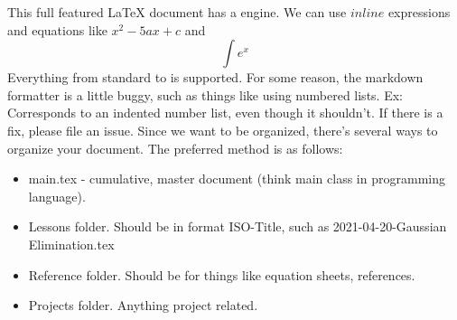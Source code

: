 \markdownRendererUlBegin
\markdownRendererUlItem This full featured LaTeX document has a  engine.\markdownRendererUlItemEnd 
\markdownRendererUlItem We can use $inline$ expressions and equations like $x^2-5ax+c$ and $$\int e^x$$\markdownRendererUlItemEnd 
\markdownRendererUlItem Everything from standard  to  is supported.\markdownRendererUlItemEnd 
\markdownRendererUlEnd \markdownRendererInterblockSeparator
{}For some reason, the markdown formatter is a little buggy, such as things like using numbered lists. Ex:\markdownRendererInterblockSeparator
{}\markdownRendererOlBeginTight
{}Corresponds to an indented number list, even though it shouldn't. If there is a fix, please file an issue.\markdownRendererOlItemEnd 
\markdownRendererOlEndTight \markdownRendererInterblockSeparator
{}\markdownRendererInterblockSeparator
{}Since we want to be organized, there's several ways to organize your document. The preferred method is as follows:\markdownRendererInterblockSeparator
{}\markdownRendererInterblockSeparator
{}\begin{itemize} \item main.tex - cumulative, master document (think main class in programming language). \item Lessons folder. Should be in format ISO-Title, such as 2021-04-20-Gaussian Elimination.tex \item Reference folder. Should be for things like equation sheets, references. \item Projects folder. Anything project related. \end{itemize}\relax